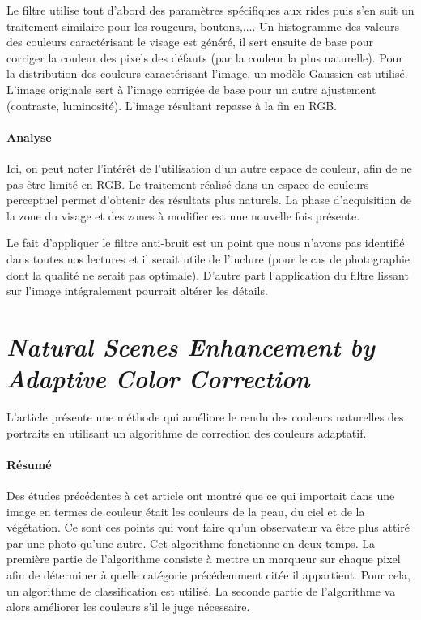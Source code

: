 \documentclass[11pt, french]{report-rd-info}
\begin{document}
Le filtre utilise tout d'abord des paramètres spécifiques aux rides puis s'en suit un traitement similaire pour les rougeurs, boutons,.... Un histogramme des valeurs des couleurs caractérisant le visage est généré, il sert ensuite de base pour corriger la couleur des pixels des défauts (par la couleur la plus naturelle). Pour la distribution des couleurs caractérisant l'image, un modèle Gaussien est utilisé. L’image originale sert à l'image corrigée de base pour un autre ajustement (contraste, luminosité). L'image résultant repasse à la fin en RGB.

\paragraph{Analyse}
Ici, on peut noter l'intérêt de l'utilisation d'un autre espace de couleur, afin de ne pas être limité en RGB. Le traitement réalisé dans un espace de couleurs perceptuel permet d'obtenir des résultats plus naturels. La phase d'acquisition de la zone du visage et des zones à modifier est une nouvelle fois présente. 

Le fait d’appliquer le filtre anti-bruit est un point que nous n’avons pas identifié dans toutes nos lectures et il serait utile de l’inclure (pour le cas de photographie dont la qualité ne serait pas optimale). D’autre part l’application du filtre lissant sur l’image intégralement pourrait altérer les détails.

\section{\emph{Natural Scenes Enhancement by Adaptive Color Correction}}
L'article \cite{Naccari} présente une méthode qui améliore le rendu des couleurs naturelles des portraits en utilisant un algorithme de correction des couleurs adaptatif.

\paragraph{Résumé}
Des études précédentes à cet article ont montré que ce qui importait dans une image en termes de couleur était les couleurs de la peau, du ciel et de la végétation. Ce sont ces points qui vont faire qu'un observateur va être plus attiré par une photo qu'une autre. Cet algorithme fonctionne en deux temps. La première partie de l'algorithme consiste à mettre un marqueur sur chaque pixel afin de déterminer à quelle catégorie précédemment citée il appartient. Pour cela, un algorithme de classification est utilisé. La seconde partie de l'algorithme va alors améliorer les couleurs s'il le juge nécessaire.
\end{document}
